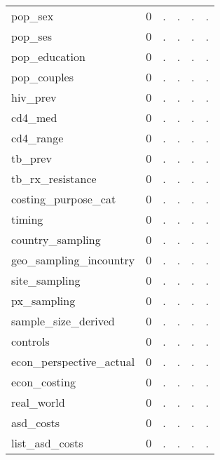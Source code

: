 \begin{table}[htbp]
\begin{tabular}{l*{1}{ccccc}}
pop\_sex     &           0&           .&           .&           .&           .\\
pop\_ses     &           0&           .&           .&           .&           .\\
pop\_education&           0&           .&           .&           .&           .\\
pop\_couples &           0&           .&           .&           .&           .\\
hiv\_prev    &           0&           .&           .&           .&           .\\
cd4\_med     &           0&           .&           .&           .&           .\\
cd4\_range   &           0&           .&           .&           .&           .\\
tb\_prev     &           0&           .&           .&           .&           .\\
tb\_rx\_resistance&           0&           .&           .&           .&           .\\
costing\_purpose\_cat&           0&           .&           .&           .&           .\\
timing      &           0&           .&           .&           .&           .\\
country\_sampling&           0&           .&           .&           .&           .\\
geo\_sampling\_incountry&           0&           .&           .&           .&           .\\
site\_sampling&           0&           .&           .&           .&           .\\
px\_sampling &           0&           .&           .&           .&           .\\
sample\_size\_derived&           0&           .&           .&           .&           .\\
controls    &           0&           .&           .&           .&           .\\
econ\_perspective\_actual&           0&           .&           .&           .&           .\\
econ\_costing&           0&           .&           .&           .&           .\\
real\_world  &           0&           .&           .&           .&           .\\
asd\_costs   &           0&           .&           .&           .&           .\\
list\_asd\_costs&           0&           .&           .&           .&           .\\

\end{tabular}
\end{table}
